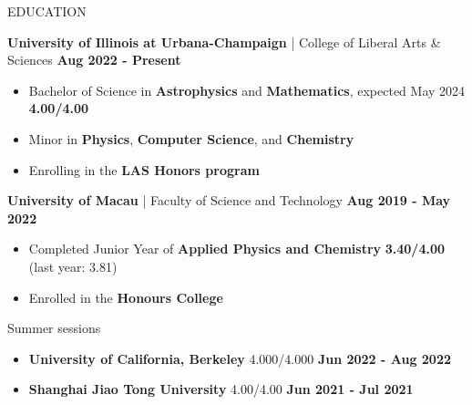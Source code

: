 \documentclass[11pt]{article}
\begin{document}

\begin{section}{EDUCATION}

\textbf{University of Illinois at Urbana-Champaign} | College of Liberal Arts \& Sciences \hfill \textbf{Aug 2022 - Present}
\begin{itemize}[leftmargin=1.5em]
    \item Bachelor of Science in \textbf{Astrophysics} and \textbf{Mathematics}, expected May 2024 \hfill \textbf{4.00/4.00} 
    \item Minor in \textbf{Physics}, \textbf{Computer Science}, and \textbf{Chemistry}
    \item Enrolling in the \textbf{LAS Honors program} 
\end{itemize}

\textbf{University of Macau} | Faculty of Science and Technology \hfill \textbf{Aug 2019 - May 2022}
\begin{itemize}[leftmargin=1.5em]
    \item Completed Junior Year of \textbf{Applied Physics and Chemistry} \hfill \textbf{3.40/4.00} (last year: 3.81)
    \item Enrolled in the \textbf{Honours College}
\end{itemize}

Summer sessions
\begin{itemize}[leftmargin=1.5em]
    \item \textbf{University of California, Berkeley} \hfill 4.000/4.000  \textbf{Jun 2022 - Aug 2022} 
    \item \textbf{Shanghai Jiao Tong University} \hfill 4.00/4.00  \textbf{Jun 2021 - Jul 2021}
\end{itemize}
    
\end{section}
\end{document}
